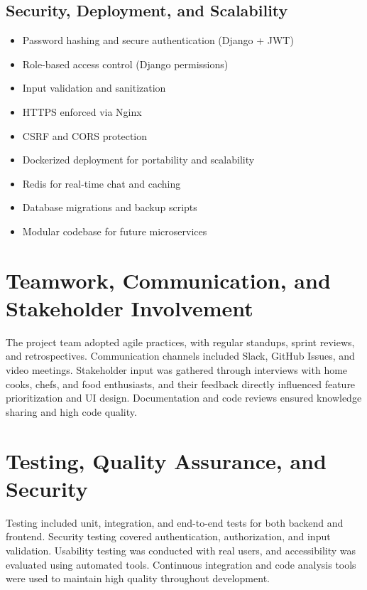 \documentclass[conference]{IEEEtran}
\begin{document}

\subsection{Security, Deployment, and Scalability}
\begin{itemize}
    \item Password hashing and secure authentication (Django + JWT)
    \item Role-based access control (Django permissions)
    \item Input validation and sanitization
    \item HTTPS enforced via Nginx
    \item CSRF and CORS protection
    \item Dockerized deployment for portability and scalability
    \item Redis for real-time chat and caching
    \item Database migrations and backup scripts
    \item Modular codebase for future microservices
\end{itemize}

\section{Teamwork, Communication, and Stakeholder Involvement}
The project team adopted agile practices, with regular standups, sprint reviews, and retrospectives. Communication channels included Slack, GitHub Issues, and video meetings. Stakeholder input was gathered through interviews with home cooks, chefs, and food enthusiasts, and their feedback directly influenced feature prioritization and UI design. Documentation and code reviews ensured knowledge sharing and high code quality.

\section{Testing, Quality Assurance, and Security}
Testing included unit, integration, and end-to-end tests for both backend and frontend. Security testing covered authentication, authorization, and input validation. Usability testing was conducted with real users, and accessibility was evaluated using automated tools. Continuous integration and code analysis tools were used to maintain high quality throughout development.
\end{document}
